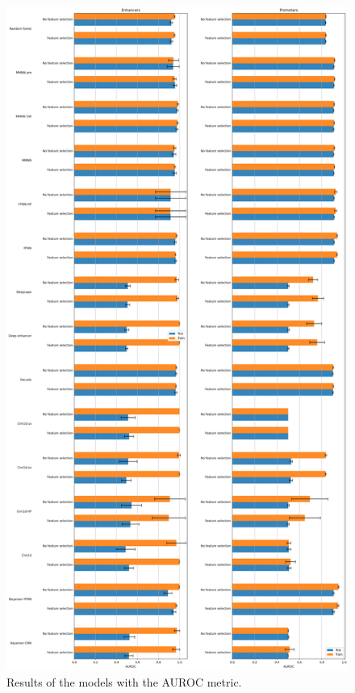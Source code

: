 \documentclass{article}
\begin{document}
\begin{figure}
    \centering
    \includegraphics[height=\textheight]{img/auroc.png}
    \caption{Results of the models with the AUROC metric.}
    \label{fig:res:auroc}
\end{figure}
\end{document}

